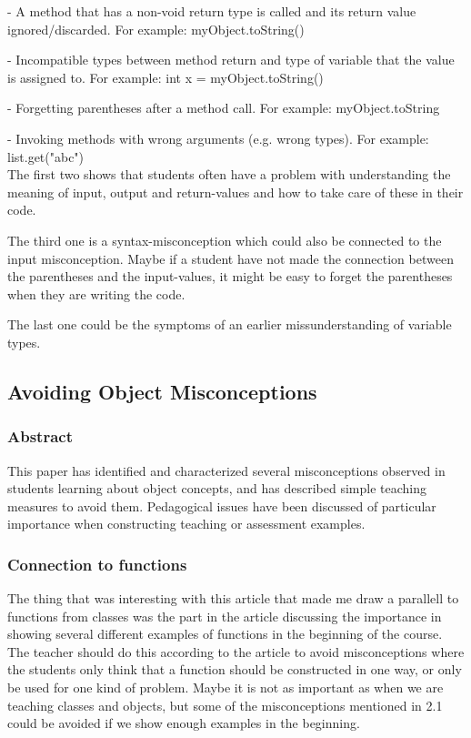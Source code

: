 \documentclass[11pt]{article} %
\begin{document}
- A method that has a non-void return type is called and its return value ignored/discarded. For example: myObject.toString()

- Incompatible types between method return and type of variable that the value is assigned to. For example: int x = myObject.toString()

- Forgetting parentheses after a method call. For example: myObject.toString

- Invoking methods with wrong arguments (e.g. wrong types). For example: list.get("abc")\\

The first two shows that students often have a problem with understanding the meaning of input, output and return-values and how to take care of these in their code. 

The third one is a syntax-misconception which could also be connected to the input misconception. Maybe if a student have not made the connection between the parentheses and the input-values, it might be easy to forget the parentheses when they are writing the code.

The last one could be the symptoms of an earlier missunderstanding of variable types. 


\subsection{Avoiding Object Misconceptions}

\subsubsection{Abstract}
This paper has identified and characterized several misconceptions observed in students learning about object concepts, and has described simple teaching measures to avoid them. Pedagogical issues have been discussed of particular importance when constructing teaching or assessment examples.

\subsubsection{Connection to functions}
The thing that was interesting with this article that made me draw a parallell to functions from classes was the part in the article discussing the importance in showing several different examples of functions in the beginning of the course. The teacher should do this according to the article to avoid misconceptions where the students only think that a function should be constructed in one way, or only be used for one kind of problem. Maybe it is not as important as when we are teaching classes and objects, but some of the misconceptions mentioned in 2.1 could be avoided if we show enough examples in the beginning. 
\end{document}
